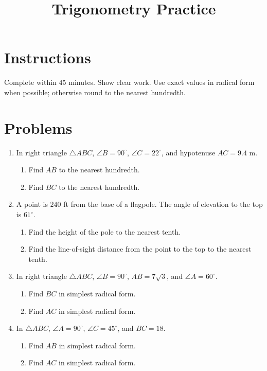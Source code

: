 \documentclass[12pt]{article}
\title{Trigonometry Practice}
\author{}
\date{}
\begin{document}
\maketitle

\section*{Instructions}
Complete within 45 minutes. Show clear work. Use exact values in radical form when possible; otherwise round to the nearest hundredth.

\section*{Problems}
\begin{enumerate}[leftmargin=*, itemsep=1em]
  \item In right triangle $\triangle ABC$, $\angle B=90^\circ$, $\angle C=22^\circ$, and hypotenuse $AC=9.4$ m.
  \begin{enumerate}[label=\alph*)]
    \item Find $AB$ to the nearest hundredth.
    \item Find $BC$ to the nearest hundredth.
  \end{enumerate}

  \item A point is $240$ ft from the base of a flagpole. The angle of elevation to the top is $61^\circ$.
  \begin{enumerate}[label=\alph*)]
    \item Find the height of the pole to the nearest tenth.
    \item Find the line-of-sight distance from the point to the top to the nearest tenth.
  \end{enumerate}

  \item In right triangle $\triangle ABC$, $\angle B=90^\circ$, $AB=7\sqrt{3}$, and $\angle A=60^\circ$.
  \begin{enumerate}[label=\alph*)]
    \item Find $BC$ in simplest radical form.
    \item Find $AC$ in simplest radical form.
  \end{enumerate}

  \item In $\triangle ABC$, $\angle A=90^\circ$, $\angle C=45^\circ$, and $BC=18$.
  \begin{enumerate}[label=\alph*)]
    \item Find $AB$ in simplest radical form.
    \item Find $AC$ in simplest radical form.
  \end{enumerate}


\end{enumerate}
\end{document}
